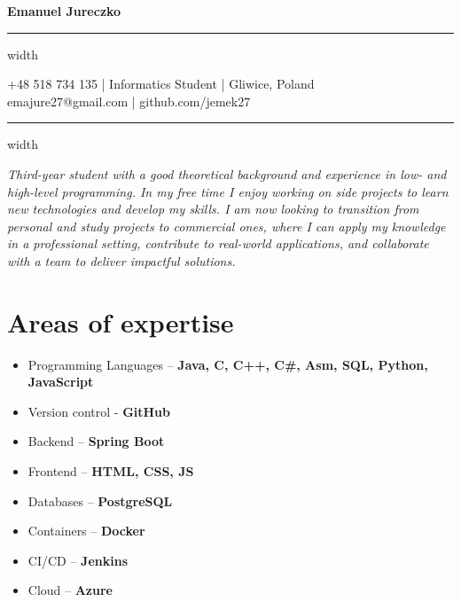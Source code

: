 \documentclass[11pt,letterpaper]{article}
\newcommand{\name}[1]{
  \begin{center}
    \Huge\textbf{#1}
  \end{center}
  \vspace{-0.5em}
  \hrule height 0.4pt width \textwidth
  \vspace{0.5em}
}
\newcommand{\contact}[5]{
  \begin{center}
    #1 | #2 | #3 \\
    #4 | #5
  \end{center}
  \vspace{-0.5em}
  \hrule height 0.4pt width \textwidth
  \vspace{0.5em}
}
\newcommand{\spacedSection}[1]{
  \vspace{0.1em}
  \section{#1}
  \vspace{1em}
}
\begin{document}
\name{Emanuel Jureczko}
\vspace{-0.5em}
\contact{+48 518 734 135}{Informatics Student}{Gliwice, Poland}{emajure27@gmail.com}{github.com/jemek27}

\vspace{-0.5em}
\begin{justify}
\textit{Third-year student with a good theoretical background and experience in low- and high-level programming.
In my free time I enjoy working on side projects to learn new technologies and develop my skills.
I am now looking to transition from personal and study projects to commercial ones, where I can apply my knowledge 
in a professional setting, contribute to real-world applications, and collaborate with a team to deliver impactful 
solutions.}
\end{justify}

\spacedSection{Areas of expertise}

\begin{minipage}[t]{0.33\textwidth}
  \begin{flushleft}
      \begin{itemize}[leftmargin=0.5cm]
          \setlength\itemsep{0.4em}
          \item Programming Languages – \textbf{Java, C, C++, C\#, Asm, SQL, Python, JavaScript}
          \item Version control - \textbf{GitHub}
      \end{itemize}
  \end{flushleft}
\end{minipage}
\begin{minipage}[t]{0.33\textwidth}
  \begin{flushleft}
      \begin{itemize}[leftmargin=0.5cm]
          \setlength\itemsep{0.4em}
          \item Backend – \textbf{Spring Boot}
          \item Frontend – \textbf{HTML, CSS, JS}
          \item Databases – \textbf{PostgreSQL}
      \end{itemize}
  \end{flushleft}
\end{minipage}
\begin{minipage}[t]{0.33\textwidth}
  \begin{flushleft}
      \begin{itemize}[leftmargin=0.5cm]
          \setlength\itemsep{0.4em}
          \item Containers – \textbf{Docker}
          \item CI/CD – \textbf{Jenkins}
          \item Cloud – \textbf{Azure}
      \end{itemize}
  \end{flushleft}
\end{minipage}
\end{document}
